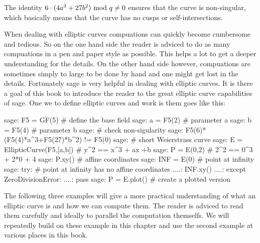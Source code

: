 The identity $6\cdot(4a^3+ 27b^2) \text{ mod } q\neq 0$ ensures that the curve is  non-singular, which basically means that the curve has no cusps or self-intersections.

When dealing with elliptic curves compuations can quickly become cumbersome and tedious. So on the one hand side the reader is adviced to do as many compuations in a pen and paper style as possible. This helps a lot to get a deeper understanding for the details. On the other hand side however, compuations are sometimes simply to large to be done by hand and one might get lost in the details. Fortunately sage is very helpful in dealing with elliptic curves. It is there a goal of this book to introduce the reader to the great elliptic curve capabilities of sage. One we to define elliptic curves and work is them goes like this:
\begin{sagecommandline}
sage: F5 = GF(5) # define the base field
sage: a = F5(2) # parameter a
sage: b = F5(4) # parameter b
sage: # check non-sigularity
sage: F5(6)*(F5(4)*a^3+F5(27)*b^2) != F5(0)
sage: # short Weierstrass curve 
sage: E = EllipticCurve(F5,[a,b]) # y^2 == x^3 + ax +b 
sage: P = E(0,2) # 2^2 == 0^3 + 2*0 + 4
sage: P.xy() # affine coordinates
sage: INF = E(0) # point at infinity
sage: try: 	# point at infinity has no affine coordinates
....:     INF.xy()
....: except ZeroDivisionError:
....:     pass
sage: P = E.plot() # create a plotted version 
\end{sagecommandline}
The following three examples will give a more practical understanding of what an elliptic curve is and how we can compute them. The reader is adviced to read them carefully and ideally to parallel the computation themselfs. We will repeatedly build on these example in this chapter and use the second example at various places in this book.
